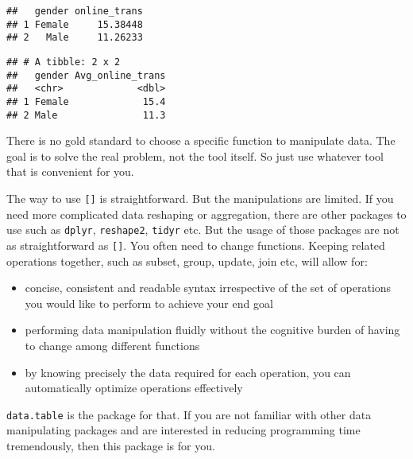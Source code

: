 \documentclass[
]{article}
\newenvironment{Shaded}{\begin{snugshade}}{\end{snugshade}}
\newcommand{\DataTypeTok}[1]{\textcolor[rgb]{0.13,0.29,0.53}{#1}}
\newcommand{\KeywordTok}[1]{\textcolor[rgb]{0.13,0.29,0.53}{\textbf{#1}}}
\newcommand{\NormalTok}[1]{#1}
\newcommand{\OperatorTok}[1]{\textcolor[rgb]{0.81,0.36,0.00}{\textbf{#1}}}
\newcommand{\StringTok}[1]{\textcolor[rgb]{0.31,0.60,0.02}{#1}}
\providecommand{\tightlist}{%
  \setlength{\itemsep}{0pt}\setlength{\parskip}{0pt}}
\begin{document}
\begin{verbatim}
##   gender online_trans
## 1 Female     15.38448
## 2   Male     11.26233
\end{verbatim}

\begin{Shaded}
\end{Shaded}

\begin{verbatim}
## # A tibble: 2 x 2
##   gender Avg_online_trans
##   <chr>             <dbl>
## 1 Female             15.4
## 2 Male               11.3
\end{verbatim}

There is no gold standard to choose a specific function to manipulate
data. The goal is to solve the real problem, not the tool itself. So
just use whatever tool that is convenient for you.

The way to use \texttt{{[}{]}} is straightforward. But the manipulations
are limited. If you need more complicated data reshaping or aggregation,
there are other packages to use such as \texttt{dplyr},
\texttt{reshape2}, \texttt{tidyr} etc. But the usage of those packages
are not as straightforward as \texttt{{[}{]}}. You often need to change
functions. Keeping related operations together, such as subset, group,
update, join etc, will allow for:

\begin{itemize}
\tightlist
\item
  concise, consistent and readable syntax irrespective of the set of
  operations you would like to perform to achieve your end goal
\item
  performing data manipulation fluidly without the cognitive burden of
  having to change among different functions
\item
  by knowing precisely the data required for each operation, you can
  automatically optimize operations effectively
\end{itemize}

\texttt{data.table} is the package for that. If you are not familiar
with other data manipulating packages and are interested in reducing
programming time tremendously, then this package is for you.
\end{document}
